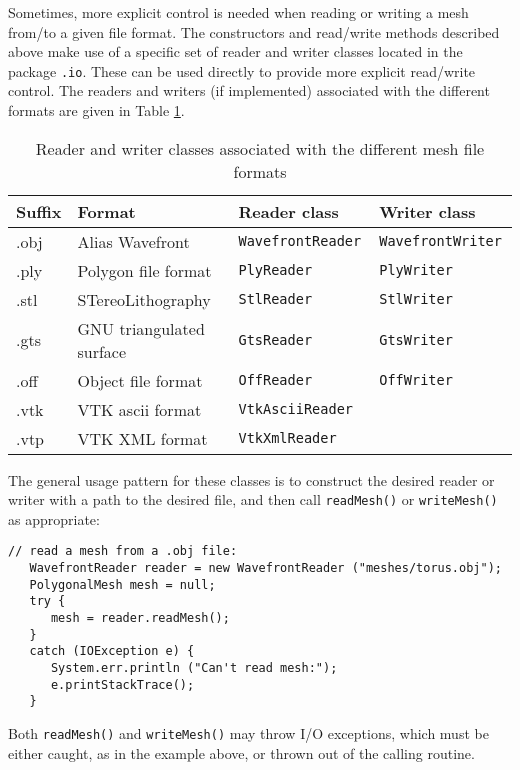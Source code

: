 Sometimes, more explicit control is needed when reading or writing a
mesh from/to a given file format.  The constructors and read/write
methods described above make use of a specific set of reader and
writer classes located in the package {\tt \mgeo.io}. These can be
used directly to provide more explicit read/write control.  The
readers and writers (if implemented) associated with the different
formats are given in Table \ref{meshReadersWriters:tbl}.

\begin{table}[h]
\centering
\begin{tabular}{|llll|}
\hline
Suffix & Format & Reader class & Writer class \\
\hline
.obj & Alias Wavefront & \tt WavefrontReader & \tt WavefrontWriter \\
.ply & Polygon file format & \tt PlyReader & \tt PlyWriter \\
.stl & STereoLithography & \tt StlReader & \tt StlWriter \\
.gts & GNU triangulated surface & \tt GtsReader & \tt GtsWriter \\
.off & Object file format & \tt OffReader & \tt OffWriter\\
.vtk & VTK ascii format & \tt VtkAsciiReader & \\
.vtp & VTK XML format & \tt VtkXmlReader & \\
\hline
\end{tabular}
\caption{Reader and writer classes associated with the different
mesh file formats}
\label{meshReadersWriters:tbl}
\end{table}

The general usage pattern for these classes is to construct the
desired reader or writer with a path to the desired file, and then
call {\tt readMesh()} or {\tt writeMesh()} as appropriate:
%
\begin{lstlisting}[]
   // read a mesh from a .obj file:
   WavefrontReader reader = new WavefrontReader ("meshes/torus.obj");
   PolygonalMesh mesh = null;
   try {
      mesh = reader.readMesh();
   }
   catch (IOException e) {
      System.err.println ("Can't read mesh:");
      e.printStackTrace();
   }
\end{lstlisting}
%
Both {\tt readMesh()} and {\tt writeMesh()} may throw I/O exceptions,
which must be either caught, as in the example above, or
thrown out of the calling routine.

